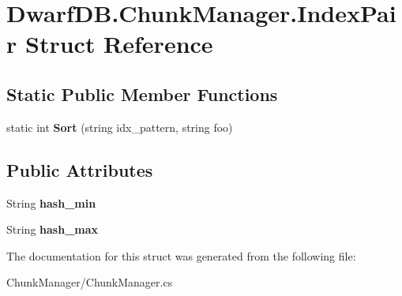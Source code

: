\hypertarget{struct_dwarf_d_b_1_1_chunk_manager_1_1_index_pair}{
\section{DwarfDB.ChunkManager.IndexPair Struct Reference}
\label{struct_dwarf_d_b_1_1_chunk_manager_1_1_index_pair}
}
\subsection*{Static Public Member Functions}
\begin{DoxyCompactItemize}
\item 
\hypertarget{struct_dwarf_d_b_1_1_chunk_manager_1_1_index_pair_a66823af2deacc422dcac11403249dc52}{
static int {\bfseries Sort} (string idx\_\-pattern, string foo)}
\label{struct_dwarf_d_b_1_1_chunk_manager_1_1_index_pair_a66823af2deacc422dcac11403249dc52}

\end{DoxyCompactItemize}
\subsection*{Public Attributes}
\begin{DoxyCompactItemize}
\item 
\hypertarget{struct_dwarf_d_b_1_1_chunk_manager_1_1_index_pair_a703b8eeb5f0a8d55006a8df195130df7}{
String {\bfseries hash\_\-min}}
\label{struct_dwarf_d_b_1_1_chunk_manager_1_1_index_pair_a703b8eeb5f0a8d55006a8df195130df7}

\item 
\hypertarget{struct_dwarf_d_b_1_1_chunk_manager_1_1_index_pair_a0c8153c980b5a092260aa85d23e1b912}{
String {\bfseries hash\_\-max}}
\label{struct_dwarf_d_b_1_1_chunk_manager_1_1_index_pair_a0c8153c980b5a092260aa85d23e1b912}

\end{DoxyCompactItemize}


The documentation for this struct was generated from the following file:\begin{DoxyCompactItemize}
\item 
ChunkManager/ChunkManager.cs\end{DoxyCompactItemize}
